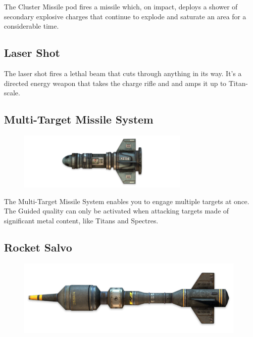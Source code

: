 \documentclass[9pt, openany]{extbook}
\begin{document}
The Cluster Missile pod fires a missile which, on impact, deploys a shower of secondary explosive charges that continue to explode and saturate an area for a considerable time.

\subsection{Laser Shot}
The laser shot fires a lethal beam that cuts through anything in its way. It's a directed energy weapon that takes the charge rifle and and amps it up to Titan-scale.

\subsection{Multi-Target Missile System}
\begin{figure}
\vspace*{-2em}
\includegraphics[width=\linewidth]{MultiTargetMissileSystem}
\end{figure}

The Multi-Target Missile System enables you to engage multiple targets at once. The Guided quality can only be activated when attacking targets made of significant metal content, like Titans and Spectres.

\subsection{Rocket Salvo}
\begin{figure}
\vspace*{-2em}
\includegraphics[width=\linewidth]{RocketSalvo}
\end{figure}
\end{document}
